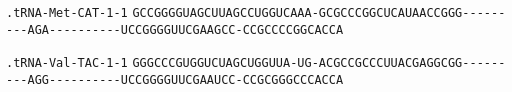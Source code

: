 \documentclass{article}
\newcommand{\rnabox}[1]{\colorbox{#1}{\texttt{#1}}}
\begin{document}
\vspace{-0.5mm}

\texttt{.tRNA-Met-CAT-1-1}
\rnabox{G}\rnabox{C}\rnabox{C}\rnabox{G}\rnabox{G}\rnabox{G}\rnabox{G}\rnabox{U}\rnabox{A}\rnabox{G}\rnabox{C}\rnabox{U}\rnabox{U}\rnabox{A}\rnabox{G}\rnabox{C}\rnabox{C}\rnabox{U}\rnabox{G}\rnabox{G}\rnabox{U}\rnabox{C}\rnabox{A}\rnabox{A}\rnabox{A}\rnabox{-}\rnabox{G}\rnabox{C}\rnabox{G}\rnabox{C}\rnabox{C}\rnabox{C}\rnabox{G}\rnabox{G}\rnabox{C}\rnabox{U}\rnabox{C}\rnabox{A}\rnabox{U}\rnabox{A}\rnabox{A}\rnabox{C}\rnabox{C}\rnabox{G}\rnabox{G}\rnabox{G}\rnabox{-}\rnabox{-}\rnabox{-}\rnabox{-}\rnabox{-}\rnabox{-}\rnabox{-}\rnabox{-}\rnabox{-}\rnabox{A}\rnabox{G}\rnabox{A}\rnabox{-}\rnabox{-}\rnabox{-}\rnabox{-}\rnabox{-}\rnabox{-}\rnabox{-}\rnabox{-}\rnabox{-}\rnabox{-}\rnabox{U}\rnabox{C}\rnabox{C}\rnabox{G}\rnabox{G}\rnabox{G}\rnabox{G}\rnabox{U}\rnabox{U}\rnabox{C}\rnabox{G}\rnabox{A}\rnabox{A}\rnabox{G}\rnabox{C}\rnabox{C}\rnabox{-}\rnabox{C}\rnabox{C}\rnabox{G}\rnabox{C}\rnabox{C}\rnabox{C}\rnabox{C}\rnabox{G}\rnabox{G}\rnabox{C}\rnabox{A}\rnabox{C}\rnabox{C}\rnabox{A}

\vspace{-0.5mm}

\texttt{.tRNA-Val-TAC-1-1}
\rnabox{G}\rnabox{G}\rnabox{G}\rnabox{C}\rnabox{C}\rnabox{C}\rnabox{G}\rnabox{U}\rnabox{G}\rnabox{G}\rnabox{U}\rnabox{C}\rnabox{U}\rnabox{A}\rnabox{G}\rnabox{C}\rnabox{U}\rnabox{G}\rnabox{G}\rnabox{U}\rnabox{U}\rnabox{A}\rnabox{-}\rnabox{U}\rnabox{G}\rnabox{-}\rnabox{A}\rnabox{C}\rnabox{G}\rnabox{C}\rnabox{C}\rnabox{G}\rnabox{C}\rnabox{C}\rnabox{C}\rnabox{U}\rnabox{U}\rnabox{A}\rnabox{C}\rnabox{G}\rnabox{A}\rnabox{G}\rnabox{G}\rnabox{C}\rnabox{G}\rnabox{G}\rnabox{-}\rnabox{-}\rnabox{-}\rnabox{-}\rnabox{-}\rnabox{-}\rnabox{-}\rnabox{-}\rnabox{-}\rnabox{A}\rnabox{G}\rnabox{G}\rnabox{-}\rnabox{-}\rnabox{-}\rnabox{-}\rnabox{-}\rnabox{-}\rnabox{-}\rnabox{-}\rnabox{-}\rnabox{-}\rnabox{U}\rnabox{C}\rnabox{C}\rnabox{G}\rnabox{G}\rnabox{G}\rnabox{G}\rnabox{U}\rnabox{U}\rnabox{C}\rnabox{G}\rnabox{A}\rnabox{A}\rnabox{U}\rnabox{C}\rnabox{C}\rnabox{-}\rnabox{C}\rnabox{C}\rnabox{G}\rnabox{C}\rnabox{G}\rnabox{G}\rnabox{G}\rnabox{C}\rnabox{C}\rnabox{C}\rnabox{A}\rnabox{C}\rnabox{C}\rnabox{A}

\vspace{-0.5mm}
\end{document}
